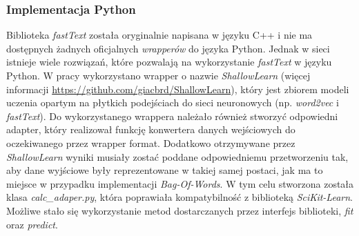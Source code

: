 \subsubsection{Implementacja Python}
Biblioteka \textit{fastText} została oryginalnie napisana w języku C++ i nie ma dostępnych żadnych oficjalnych \textit{wrapperów} do języka Python. Jednak w sieci istnieje wiele rozwiązań, które pozwalają na wykorzystanie \textit{fastText} w języku Python. W pracy wykorzystano wrapper o nazwie \textit{ShallowLearn} (więcej informacji \url{https://github.com/giacbrd/ShallowLearn}), który jest zbiorem modeli uczenia opartym na płytkich podejściach do sieci neuronowych (np. \textit{word2vec} i \textit{fastText}). Do wykorzystanego wrappera należało również stworzyć odpowiedni adapter, który realizował funkcję konwertera danych wejściowych do oczekiwanego przez wrapper format. Dodatkowo otrzymywane przez \textit{ShallowLearn} wyniki musiały zostać poddane odpowiedniemu przetworzeniu tak, aby dane wyjściowe były reprezentowane w takiej samej postaci, jak ma to miejsce w przypadku implementacji \textit{Bag-Of-Words}. W tym celu stworzona została klasa \textit{calc\_adaper.py}, która poprawiała kompatybilność z biblioteką \textit{SciKit-Learn}. Możliwe stało się wykorzystanie metod dostarczanych przez interfejs biblioteki, \textit{fit} oraz \textit{predict}.